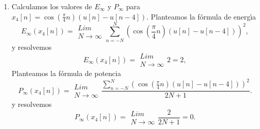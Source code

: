 \begin{enumerate}
\item Calculamos los valores de $E_{\infty }$ y $P_{\infty }$ para 
$x_{4}\left[ n\right] =
  \cos \left( \frac{\pi }{4}n\right) \left( u\left[ n\right] -u\left[
      n-4\right] \right)$.
Planteamos la f\'{o}rmula de energ\'{\i}a
\begin{equation}
E_{\infty }\left( x_{4}\left[ n\right] \right) = 
\begin{array}{c}
Lim \\ 
N\rightarrow \infty
\end{array}
\sum_{n=-N}^{N}\left( \cos \left( \frac{\pi }{4}n\right) \left( u\left[ n
\right] -u\left[ n-4\right] \right) \right) ^{2},
\end{equation}
y resolvemos
\begin{equation}
E_{\infty }\left( x_{4}\left[ n\right] \right) = 
\begin{array}{c}
Lim \\ 
N\rightarrow \infty
\end{array}
2=2,
\end{equation}
Planteamos la f\'{o}rmula de potencia
\begin{equation}
P_{\infty }\left( x_{4}\left[ n\right] \right) = 
\begin{array}{c}
Lim \\ 
N\rightarrow \infty
\end{array}
\frac{\sum_{n=-N}^{N}\left( \cos \left( \frac{\pi }{4}n\right) \left(
      u\left[ n\right] -u\left[ n-4\right] \right) \right)
  ^{2}}{2N+1}.
\end{equation}
y resolvemos
\begin{equation}
P_{\infty }\left( x_{4}\left[ n\right] \right) = 
\begin{array}{c}
Lim \\ 
N\rightarrow \infty
\end{array}
\frac{2}{2N+1}=0.
\end{equation}


\end{enumerate}
